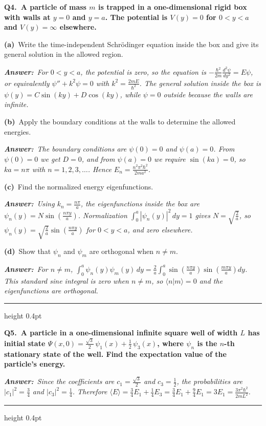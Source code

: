 \documentclass[11pt]{article}
\newcommand{\QuestionStyle}[1]{{\large\bfseries\boldmath #1}}
\newcommand{\OEBlock}[3]{%
  \Needspace{5\baselineskip}%
  \noindent
  \begin{minipage}{\linewidth}
    \QuestionStyle{#1.~#2}

    \vspace{0.25em}
    \noindent\textcolor{AnsRed}{\textit{\textbf{Answer:}~#3}}

    \vspace{0.25em}
    \hrule height 0.4pt
  \end{minipage}
  \vspace{0.75em}
}
\newcommand{\MPBlock}[3]{%
  \Needspace{8\baselineskip}%
  \noindent
  \begin{minipage}{\linewidth}
    \QuestionStyle{#1.~#2}

    \vspace{0.25em}
    #3

    \vspace{0.25em}
    \hrule height 0.4pt
  \end{minipage}
  \vspace{0.75em}
}
\newcommand{\OEPart}[3]{%
  \par\vspace{0.35em}
  \noindent\textbf{(#1)}~#2
  \par\vspace{0.15em}
  \noindent\textit{\textbf{Answer:}~#3}
  \par
}
\begin{document}
\MPBlock{Q4}{A particle of mass $m$ is trapped in a one-dimensional rigid box with walls at $y=0$ and $y=a$. The potential is $V(y)=0$ for $0<y<a$ and $V(y)=\infty$ elsewhere.}{%
\OEPart{a}{Write the time-independent Schr\"odinger equation inside the box and give its general solution in the allowed region.}{For $0<y<a$, the potential is zero, so the equation is $-\frac{\hbar^2}{2m}\frac{d^2\psi}{dy^2}=E\psi$, or equivalently $\psi''+k^2\psi=0$ with $k^2=\frac{2mE}{\hbar^2}$. The general solution inside the box is $\psi(y)=C\sin(ky)+D\cos(ky)$, while $\psi=0$ outside because the walls are infinite.}
\OEPart{b}{Apply the boundary conditions at the walls to determine the allowed energies.}{The boundary conditions are $\psi(0)=0$ and $\psi(a)=0$. From $\psi(0)=0$ we get $D=0$, and from $\psi(a)=0$ we require $\sin(ka)=0$, so $ka=n\pi$ with $n=1,2,3,\ldots$. Hence $E_n=\frac{n^2\pi^2\hbar^2}{2ma^2}$.}
\OEPart{c}{Find the normalized energy eigenfunctions.}{Using $k_n=\frac{n\pi}{a}$, the eigenfunctions inside the box are $\psi_n(y)=N\sin\!\left(\frac{n\pi y}{a}\right)$. Normalization $\int_0^a |\psi_n(y)|^2\,dy=1$ gives $N=\sqrt{\frac{2}{a}}$, so $\psi_n(y)=\sqrt{\frac{2}{a}}\sin\!\left(\frac{n\pi y}{a}\right)$ for $0<y<a$, and zero elsewhere.}
\OEPart{d}{Show that $\psi_n$ and $\psi_m$ are orthogonal when $n\neq m$.}{For $n\neq m$, $\int_0^a \psi_n(y)\psi_m(y)\,dy=\frac{2}{a}\int_0^a \sin\!\left(\frac{n\pi y}{a}\right)\sin\!\left(\frac{m\pi y}{a}\right)dy$. This standard sine integral is zero when $n\ne m$, so $\langle n|m\rangle=0$ and the eigenfunctions are orthogonal.}
}

\OEBlock{Q5}{A particle in a one-dimensional infinite square well of width $L$ has initial state $\Psi(x,0)=\frac{\sqrt{3}}{2}\,\psi_1(x)+\frac{1}{2}\,\psi_3(x)$, where $\psi_n$ is the $n$-th stationary state of the well. Find the expectation value of the particle's energy.}{Since the coefficients are $c_1=\frac{\sqrt{3}}{2}$ and $c_3=\frac{1}{2}$, the probabilities are $|c_1|^2=\frac{3}{4}$ and $|c_3|^2=\frac{1}{4}$. Therefore $\langle E\rangle=\frac{3}{4}E_1+\frac{1}{4}E_3=\frac{3}{4}E_1+\frac{9}{4}E_1=3E_1=\frac{3\pi^2\hbar^2}{2mL^2}$.}
\end{document}
